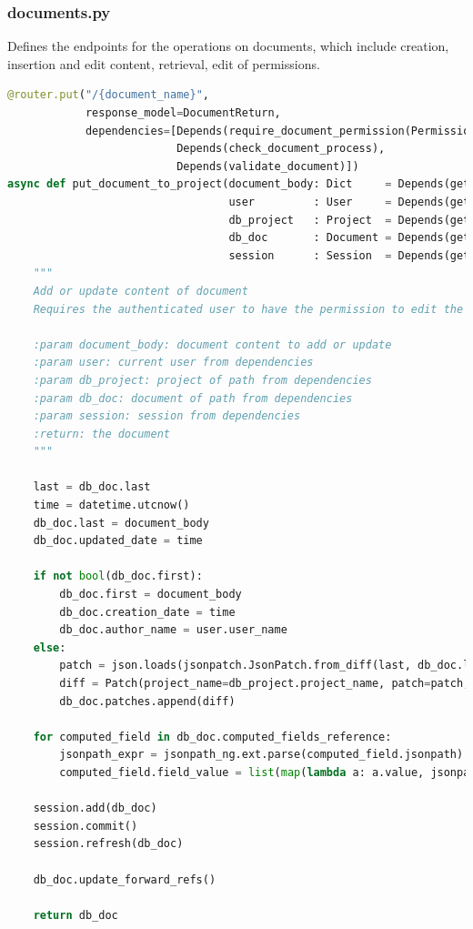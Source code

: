 \documentclass[12pt]{report}
\begin{document}
\subsubsection{documents.py}
Defines the endpoints for the operations on documents, which include creation, insertion and edit content, retrieval, edit of permissions.

\begin{lstlisting}[language=Python, caption=Set document content]
@router.put("/{document_name}",
            response_model=DocumentReturn,
            dependencies=[Depends(require_document_permission(Permissions.edit)),
                          Depends(check_document_process),
                          Depends(validate_document)])
async def put_document_to_project(document_body: Dict     = Depends(get_request_body),
                                  user         : User     = Depends(get_current_active_user),
                                  db_project   : Project  = Depends(get_project),
                                  db_doc       : Document = Depends(get_document),
                                  session      : Session  = Depends(get_session)):
    """
    Add or update content of document
    Requires the authenticated user to have the permission to edit the document

    :param document_body: document content to add or update
    :param user: current user from dependencies
    :param db_project: project of path from dependencies
    :param db_doc: document of path from dependencies
    :param session: session from dependencies
    :return: the document
    """

    last = db_doc.last
    time = datetime.utcnow()
    db_doc.last = document_body
    db_doc.updated_date = time

    if not bool(db_doc.first):
        db_doc.first = document_body
        db_doc.creation_date = time
        db_doc.author_name = user.user_name
    else:
        patch = json.loads(jsonpatch.JsonPatch.from_diff(last, db_doc.last).to_string())
        diff = Patch(project_name=db_project.project_name, patch=patch, user_name=user.user_name)
        db_doc.patches.append(diff)

    for computed_field in db_doc.computed_fields_reference:
        jsonpath_expr = jsonpath_ng.ext.parse(computed_field.jsonpath)
        computed_field.field_value = list(map(lambda a: a.value, jsonpath_expr.find(db_doc.last)))

    session.add(db_doc)
    session.commit()
    session.refresh(db_doc)

    db_doc.update_forward_refs()

    return db_doc
\end{lstlisting}
\end{document}
